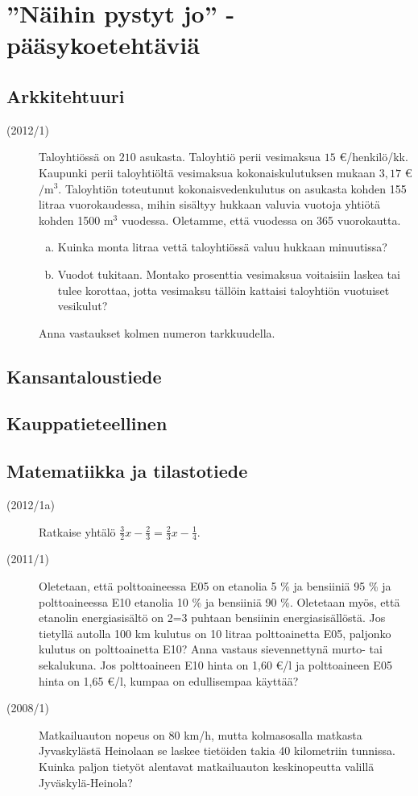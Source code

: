 \chapter{''Näihin pystyt jo'' -pääsykoetehtäviä}

\section{Arkkitehtuuri}

\begin{description}
\item[(2012/1)] Taloyhtiössä on $210$ asukasta. Taloyhtiö perii vesimaksua $15$ \euro/henkilö/kk.
Kaupunki perii taloyhtiöltä vesimaksua kokonaiskulutuksen mukaan $3,17$ \euro $/ \mathrm{m}^3$.
Taloyhtiön toteutunut kokonaisvedenkulutus on asukasta kohden 155 litraa vuorokaudessa, mihin sisältyy hukkaan valuvia vuotoja yhtiötä kohden 1500 $\mathrm{m}^3$ vuodessa. Oletamme, että vuodessa on 365 vuorokautta.
\begin{enumerate}[(a)]
\item Kuinka monta litraa vettä taloyhtiössä valuu hukkaan minuutissa?
\item Vuodot tukitaan. Montako prosenttia vesimaksua voitaisiin laskea tai tulee korottaa, jotta vesimaksu tällöin kattaisi taloyhtiön vuotuiset vesikulut?
\end{enumerate}
Anna vastaukset kolmen numeron tarkkuudella.
\end{description}

\section{Kansantaloustiede}

\section{Kauppatieteellinen}

\section{Matematiikka ja tilastotiede}

\begin{description}
	\item[(2012/1a)] Ratkaise yhtälö $\frac{3}{2}x - \frac{2}{3} = \frac{2}{3}x - \frac{1}{4}$.
	\item[(2011/1)] Oletetaan, että polttoaineessa E05 on etanolia 5 \% ja bensiiniä 95 \% ja polttoaineessa E10 etanolia 			10 \% ja bensiiniä 90 \%. Oletetaan myös, että etanolin energiasisältö on 2=3 puhtaan bensiinin
		energiasisällöstä. Jos tietyllä autolla 100 km kulutus on 10 litraa polttoainetta E05, paljonko kulutus on 
		polttoainetta E10? Anna vastaus sievennettynä murto- tai sekalukuna. Jos polttoaineen 
		E10 hinta on 1,60 €/l ja polttoaineen E05 hinta on 1,65 €/l, kumpaa on edullisempaa käyttää?
	\item[(2008/1)] Matkailuauton nopeus on 80 km/h, mutta kolmasosalla matkasta Jyvaskylästä Heinolaan se laskee tietöiden takia 40 kilometriin tunnissa. Kuinka paljon tietyöt alentavat matkailuauton keskinopeutta valillä Jyväskylä-Heinola?
\end{description}

